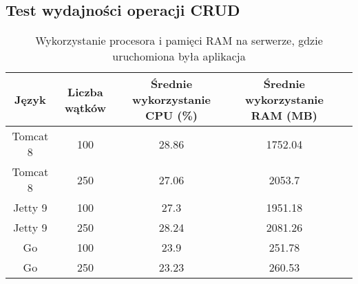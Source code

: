  \newpage
 \subsection{Test wydajności operacji CRUD}

 \clearpage

\begin{table}[!htb]
\centering
\caption{Wykorzystanie procesora i pamięci RAM na serwerze, gdzie uruchomiona była aplikacja}
\label{tab:app-full-crud}
\begin{tabular}{@{}ccccl@{}}
\toprule
\textbf{Język} & \textbf{Liczba wątków} & \multicolumn{1}{p{3cm}}{\textbf{Średnie wykorzystanie CPU (\%)}} & \multicolumn{1}{p{3cm}}{\textbf{Średnie wykorzystanie RAM (MB)}} &  \\ \midrule
Tomcat 8       & 100                    & 28.86                             & 1752.04                          &  \\
Tomcat 8       & 250                    & 27.06                             & 2053.7                          &  \\
Jetty 9       & 100                    & 27.3                             & 1951.18                          &  \\
Jetty 9       & 250                    & 28.24                             & 2081.26                          &  \\
Go       & 100                    & 23.9                             & 251.78                          &  \\
Go       & 250                    & 23.23                             & 260.53                          &  \\
\bottomrule
\end{tabular}
\end{table}


